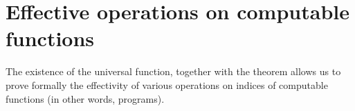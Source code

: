 \section{Effective operations on computable functions}
The existence of the universal function, together with the \smn
theorem allows us to prove formally the effectivity of various
operations on indices of computable functions (in other words,
programs).







